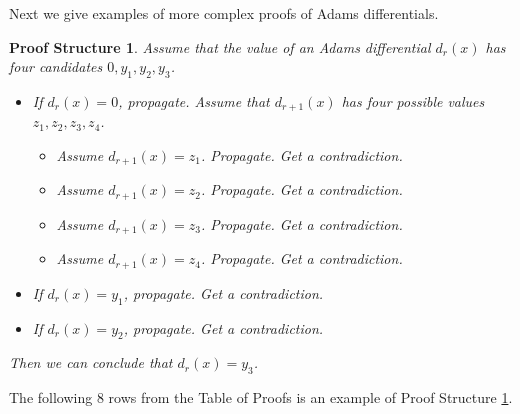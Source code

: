\documentclass{amsart}
\numberwithin{equation}{section}
\newtheorem{proofstr}[theorem]{Proof Structure}
\begin{document}
Next we give examples of more complex proofs of Adams differentials.
\begin{proofstr}\label{ps:cfb2f966}
Assume that the value of an Adams differential $d_r(x)$ has four candidates $0, y_1,y_2,y_3$.
\begin{itemize}
    \item If $d_r(x)=0$, propagate. Assume that $d_{r+1}(x)$ has four possible values $z_1, z_2, z_3, z_4$.
    \begin{itemize}
        \item Assume $d_{r+1}(x)=z_1$. Propagate. Get a contradiction.
        \item Assume $d_{r+1}(x)=z_2$. Propagate. Get a contradiction.
        \item Assume $d_{r+1}(x)=z_3$. Propagate. Get a contradiction.
        \item Assume $d_{r+1}(x)=z_4$. Propagate. Get a contradiction.
    \end{itemize}
    \item If $d_r(x)=y_1$, propagate. Get a contradiction.
    \item If $d_r(x)=y_2$, propagate. Get a contradiction.
\end{itemize}
Then we can conclude that $d_r(x)=y_3$.
\end{proofstr}

The following 8 rows from the Table of Proofs is an example of Proof Structure \ref{ps:cfb2f966}.\vspace{5pt}
\begin{center}\end{center}\vspace{5pt}\vspace{5pt}
\end{document}
